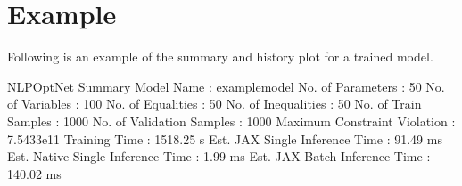 \documentclass[letterpaper,10pt,english,openany,oneside]{sphinxmanual}
\begin{document}
\begin{sphinxVerbatim}[commandchars=\\\{\}]
  


   
\end{sphinxVerbatim}


\chapter{Example}
\label{\detokenize{index:example}}
\sphinxAtStartPar
Following is an example of the summary and history plot for a trained model.

\begin{sphinxVerbatim}[commandchars=\\\{\}]
\end{sphinxVerbatim}

\begin{sphinxVerbatim}[commandchars=\\\{\}]
NLPOptNet Summary
\PYGZhy{}\PYGZhy{}\PYGZhy{}\PYGZhy{}\PYGZhy{}\PYGZhy{}\PYGZhy{}\PYGZhy{}\PYGZhy{}\PYGZhy{}\PYGZhy{}\PYGZhy{}\PYGZhy{}\PYGZhy{}\PYGZhy{}\PYGZhy{}\PYGZhy{}\PYGZhy{}\PYGZhy{}\PYGZhy{}\PYGZhy{}\PYGZhy{}\PYGZhy{}\PYGZhy{}\PYGZhy{}\PYGZhy{}\PYGZhy{}\PYGZhy{}\PYGZhy{}\PYGZhy{}\PYGZhy{}\PYGZhy{}\PYGZhy{}\PYGZhy{}\PYGZhy{}\PYGZhy{}\PYGZhy{}\PYGZhy{}\PYGZhy{}\PYGZhy{}\PYGZhy{}\PYGZhy{}\PYGZhy{}\PYGZhy{}\PYGZhy{}\PYGZhy{}\PYGZhy{}\PYGZhy{}\PYGZhy{}\PYGZhy{}\PYGZhy{}\PYGZhy{}\PYGZhy{}\PYGZhy{}\PYGZhy{}\PYGZhy{}\PYGZhy{}\PYGZhy{}\PYGZhy{}\PYGZhy{}
Model Name                        : example\PYGZus{}model
No. of Parameters                 : 50
No. of Variables                  : 100
No. of Equalities                 : 50
No. of Inequalities               : 50
No. of Train Samples              : 1000
No. of Validation Samples         : 1000
Maximum Constraint Violation      : 7.5433e\PYGZhy{}11
Training Time                     : 1518.25 s
Est. JAX Single Inference Time    : 91.49 ms
Est. Native Single Inference Time : 1.99 ms
Est. JAX Batch Inference Time     : 140.02 ms
\PYGZhy{}\PYGZhy{}\PYGZhy{}\PYGZhy{}\PYGZhy{}\PYGZhy{}\PYGZhy{}\PYGZhy{}\PYGZhy{}\PYGZhy{}\PYGZhy{}\PYGZhy{}\PYGZhy{}\PYGZhy{}\PYGZhy{}\PYGZhy{}\PYGZhy{}\PYGZhy{}\PYGZhy{}\PYGZhy{}\PYGZhy{}\PYGZhy{}\PYGZhy{}\PYGZhy{}\PYGZhy{}\PYGZhy{}\PYGZhy{}\PYGZhy{}\PYGZhy{}\PYGZhy{}\PYGZhy{}\PYGZhy{}\PYGZhy{}\PYGZhy{}\PYGZhy{}\PYGZhy{}\PYGZhy{}\PYGZhy{}\PYGZhy{}\PYGZhy{}\PYGZhy{}\PYGZhy{}\PYGZhy{}\PYGZhy{}\PYGZhy{}\PYGZhy{}\PYGZhy{}\PYGZhy{}\PYGZhy{}\PYGZhy{}\PYGZhy{}\PYGZhy{}\PYGZhy{}\PYGZhy{}\PYGZhy{}\PYGZhy{}\PYGZhy{}\PYGZhy{}\PYGZhy{}\PYGZhy{}
\end{sphinxVerbatim}
\end{document}
